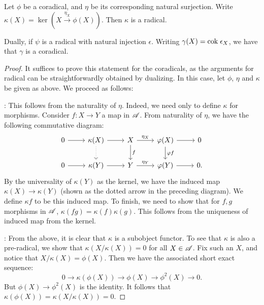 \begin{prop}\label{prop_rad_eq_corad}
Let $\phi$ be a coradical, and $\eta$ be its corresponding natural 
surjection. Write $\kappa(X) = \ker (X \stackrel{\eta_X}{\to} 
\phi(X))$. Then $\kappa$ is a radical.

Dually, if $\psi$ is a radical with natural injection $\epsilon$.
Writing $\gamma(X) = \mathrm{cok}\; \epsilon_X$, we have that $\gamma$ is
a coradical.
\end{prop}
\begin{proof}
It suffices to prove this statement for the coradicals, as the
arguments for radical can be straightforwardly obtained by 
dualizing. In this case, let $\phi$, $\eta$ and $\kappa$ be given as
above. We proceed as follows:

: This follows from the naturality 
of $\eta$. Indeed, we need only to define $\kappa$ for morphisms. 
Consider $f: X \to Y$ a map in $\mathscr{A}$. From naturality of 
$\eta$, we have the following commutative diagram:
\[
\begin{tikzcd}
0 \arrow{r} &
\kappa(X) \arrow{r} \arrow[dotted]{d} &
X \arrow{r}{\eta_X} \arrow{d}{f} &
\phi(X) \arrow{r} \arrow{d}{\phi f} &
0 \\
0 \arrow{r} &
\kappa(Y) \arrow{r} &
Y \arrow{r}{\eta_Y} &
\phi(Y) \arrow{r} &
0.
\end{tikzcd}
\]
By the universality of $\kappa(Y)$ as the kernel, we have the 
induced map $\kappa(X) \to \kappa(Y)$ (shown as the dotted arrow 
in the preceding diagram). We define $\kappa f$ to be this induced
map. To finish, we need to show that for $f, g$ morphisms in 
$\mathscr{A}$, $\kappa(fg) = \kappa(f)\kappa(g)$. This follows from
the uniqueness of induced map from the kernel.

: From the above, it is clear 
that $\kappa$ is a subobject functor. To see that $\kappa$ is also
a pre-radical, we show that $\kappa(X/\kappa(X)) = 0$ for all $X 
\in \mathscr{A}$. Fix such an $X$, and notice that $X/\kappa(X) = 
\phi(X)$. Then we have the associated short exact sequence:
\[
0 \to \kappa(\phi(X)) \to \phi(X) \to \phi^2(X) \to 0.
\]
But $\phi(X) \to \phi^2(X)$ is the identity. It follows that 
$\kappa(\phi(X)) = \kappa(X/\kappa(X)) = 0$.
\end{proof}

